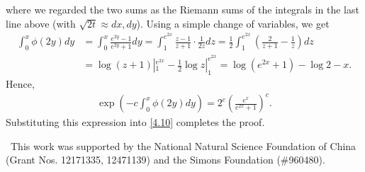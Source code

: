 \documentclass[12pt]{article}
\numberwithin{equation}{section}
\begin{document}
where we regarded the two sums as the Riemann sums of the integrals in the last line above (with $\sqrt{2t}\approx dx, dy$).
Using a simple change of variables, we get
\begin{align*}
\int_{0}^{x}\phi(2y)dy&=\int_{0}^{x}\frac{e^{2y}-1}{e^{2y}+1}dy=\int_{1}^{e^{2x}}\frac{z-1}{z+1}\cdot \frac{1}{2z}dz=\frac{1}{2}\int_{1}^{e^{2x}}\left( \frac{2}{z+1}-\frac{1}{z}\right)dz\\
&=\log(z+1)|_{1}^{e^{2x}}-\frac{1}{2}\log z |_{1}^{e^{2x}}=\log(e^{2x}+1)-\log2-x.
\end{align*}
Hence,
\begin{align*}
\exp\left(-c \int_{0}^{x}\phi(2y)dy\right)=2^{c}\left(\frac{e^{x}}{e^{2x}+1}\right)^{c}.
\end{align*}
Substituting this expression into  \eqref{4.10}  completes the proof.
\hfill\fbox


\smallskip

\  This work was supported by the National Natural Science Foundation of China (Grant Nos. 12171335, 12471139) and the Simons Foundation (\#960480).
\end{document}
